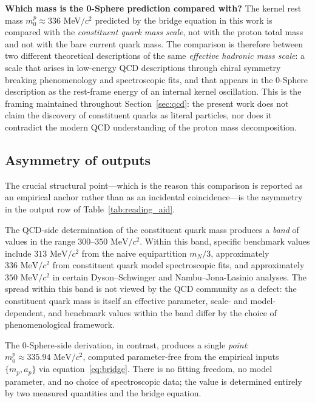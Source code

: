 \documentclass[%
 reprint, amsmath,amssymb, aps, prc, ]{revtex4-2}
\numberwithin{equation}{section}
\begin{document}
\medskip

\noindent\textbf{Which mass is the 0-Sphere prediction compared with?}
The kernel rest mass $m_0^p \approx 336$ MeV$/c^2$ predicted by the bridge equation in this work is compared with the \emph{constituent quark mass scale}, not with the proton total mass and not with the bare current quark mass. The comparison is therefore between two different theoretical descriptions of the same \emph{effective hadronic mass scale}: a scale that arises in low-energy QCD descriptions through chiral symmetry breaking phenomenology and spectroscopic fits, and that appears in the 0-Sphere description as the rest-frame energy of an internal kernel oscillation. This is the framing maintained throughout Section~\ref{sec:qcd}: the present work does not claim the discovery of constituent quarks as literal particles, nor does it contradict the modern QCD understanding of the proton mass decomposition.

\subsection{Asymmetry of outputs}

The crucial structural point---which is the reason this comparison is reported as an empirical anchor rather than as an incidental coincidence---is the asymmetry in the output row of Table~\ref{tab:reading_aid}.

The QCD-side determination of the constituent quark mass produces a \emph{band} of values in the range $300\text{--}350 \text{ MeV}/c^2$. Within this band, specific benchmark values include $313 \text{ MeV}/c^2$ from the naive equipartition $m_N/3$, approximately $336 \text{ MeV}/c^2$ from constituent quark model spectroscopic fits, and approximately $350 \text{ MeV}/c^2$ in certain Dyson--Schwinger and Nambu--Jona-Lasinio analyses. The spread within this band is not viewed by the QCD community as a defect: the constituent quark mass is itself an effective parameter, scale- and model-dependent, and benchmark values within the band differ by the choice of phenomenological framework.

The 0-Sphere-side derivation, in contrast, produces a single \emph{point}: $m_0^p \approx 335.94 \text{ MeV}/c^2$, computed parameter-free from the empirical inputs $\{m_p, a_p\}$ via equation~\eqref{eq:bridge}. There is no fitting freedom, no model parameter, and no choice of spectroscopic data; the value is determined entirely by two measured quantities and the bridge equation.
\end{document}
